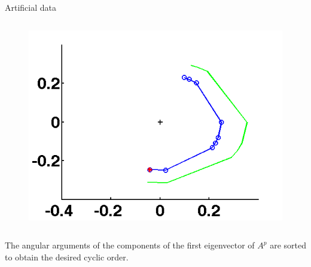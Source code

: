 \documentclass[final,hyperref={pdfpagelabels=false}]{beamer}
\begin{document}
\begin{columns}[t]
\begin{column}{.44\textwidth}
\begin{block}{Artificial data}
\begin{column}{.58\textwidth}
\begin{figure}
    		\includegraphics[trim=0 -30 0 0,clip,width=.45\textwidth, height=.40\textwidth]{pictures/poster/toy_phases.png}
    	\end{figure}
    	\end{column}
    	\begin{column}{.2\textwidth}
    		\vfill
    		The angular arguments of the components of the first eigenvector of $A^p$ are sorted to obtain the desired cyclic order.
    		\vfill
    	\end{column}
    \end{block}
    \begin{flushright}\cite{emily-yuliy}\end{flushright}
			

\end{column}
\end{columns}
\end{document}
